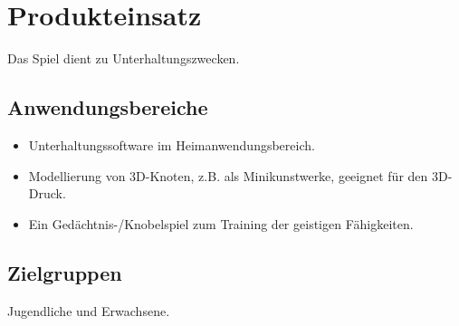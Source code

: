\chapter{Produkteinsatz}

Das Spiel dient zu Unterhaltungszwecken.

\section{Anwendungsbereiche}


\begin{itemize}

	\item Unterhaltungssoftware im Heimanwendungsbereich. 
	
	\item Modellierung von 3D-Knoten,
	z.B. als Minikunstwerke, geeignet für den 3D-Druck.
	
	\item Ein Gedächtnis-/Knobelspiel zum Training der
	geistigen Fähigkeiten. 
	
\end{itemize}

\section{Zielgruppen}

Jugendliche und Erwachsene.




